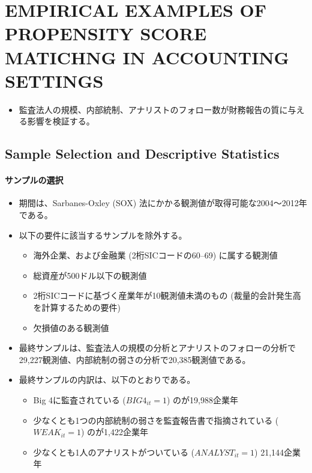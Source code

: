\section{EMPIRICAL EXAMPLES OF PROPENSITY SCORE MATICHNG IN ACCOUNTING SETTINGS}

\begin{itemize}
 \item 監査法人の規模、内部統制、アナリストのフォロー数が財務報告の質に与える影響を検証する。
\end{itemize}

\subsection*{Sample Selection and Descriptive Statistics}

\paragraph{サンプルの選択}

\begin{itemize}
 \item 期間は、Sarbanes-Oxley (SOX) 法にかかる観測値が取得可能な2004〜2012年である。
 \item 以下の要件に該当するサンプルを除外する。
   \begin{itemize}
    \item 海外企業、および金融業 (2桁SICコードの60--69) に属する観測値
    \item 総資産が500ドル以下の観測値
    \item 2桁SICコードに基づく産業年が10観測値未満のもの (裁量的会計発生高を計算するための要件) 
    \item 欠損値のある観測値
   \end{itemize}
 \item 最終サンプルは、監査法人の規模の分析とアナリストのフォローの分析で29,227観測値、内部統制の弱さの分析で20,385観測値である。
 \item 最終サンプルの内訳は、以下のとおりである。
    \begin{itemize}
    \item Big 4に監査されている ($\mathit{BIG}4_{it}=1$) のが19,988企業年
    \item 少なくとも1つの内部統制の弱さを監査報告書で指摘されている ($\mathit{WEAK}_{it}=1$) のが1,422企業年
    \item 少なくとも1人のアナリストがついている ($\mathit{ANALYST}_{it}=1$) 21,144企業年
   \end{itemize}
\end{itemize}

